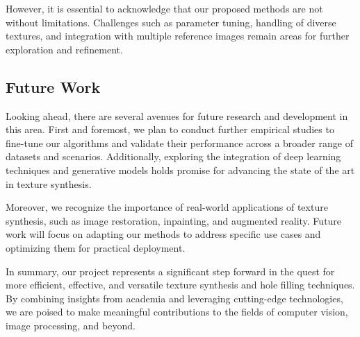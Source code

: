 \begin{conclusion}
However, it is essential to acknowledge that our proposed methods are not without limitations. Challenges such as parameter tuning, handling of diverse textures, and integration with multiple reference images remain areas for further exploration and refinement.

\subsection{Future Work}

Looking ahead, there are several avenues for future research and development in this area. First and foremost, we plan to conduct further empirical studies to fine-tune our algorithms and validate their performance across a broader range of datasets and scenarios. Additionally, exploring the integration of deep learning techniques and generative models holds promise for advancing the state of the art in texture synthesis.

Moreover, we recognize the importance of real-world applications of texture synthesis, such as image restoration, inpainting, and augmented reality. Future work will focus on adapting our methods to address specific use cases and optimizing them for practical deployment.

In summary, our project represents a significant step forward in the quest for more efficient, effective, and versatile texture synthesis and hole filling techniques. By combining insights from academia and leveraging cutting-edge technologies, we are poised to make meaningful contributions to the fields of computer vision, image processing, and beyond.


\end{conclusion}
